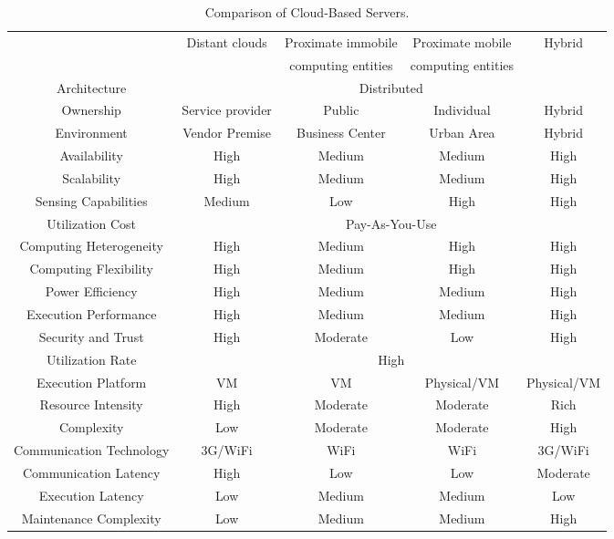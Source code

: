 \documentclass[publish]{IEEEtran}
\begin{document}
\begin{table*} [tbph]
\centering
\caption{Comparison of Cloud-Based Servers.} \label{cloud-basedservers}
\begin{tabular}{|c|c|c|c|c|}\hline
& Distant clouds& Proximate immobile & Proximate mobile & Hybrid \\  
& & computing entities & computing entities& \\ \hline
Architecture &\multicolumn{4}{c|}{Distributed}\\ \hline
Ownership& Service provider& Public & Individual& Hybrid\\  \hline
Environment& Vendor Premise & Business Center & Urban Area & Hybrid\\ \hline
Availability & High & Medium& Medium& High \\ \hline
Scalability& High & Medium & Medium& High\\ \hline
Sensing Capabilities& Medium & Low & High & High \\ \hline 
Utilization Cost& \multicolumn{4}{c|}{Pay-As-You-Use}\\ \hline
Computing Heterogeneity & High & Medium& High&High \\ \hline
Computing Flexibility& High&Medium&High& High\\ \hline
Power Efficiency & High&Medium&Medium& High\\ \hline
Execution Performance& High&Medium &  Medium & High\\ \hline
Security and Trust&\multicolumn{1}{c|}{High} & \multicolumn{1}{c|}{Moderate}&\multicolumn{1}{c|}{Low}&\multicolumn{1}{c|}{High}\\ \hline
Utilization Rate & \multicolumn{4}{c|}{High}\\ \hline
Execution Platform & VM & VM & Physical/VM& Physical/VM \\ \hline
Resource Intensity & High & Moderate& Moderate& Rich\\ \hline
Complexity & Low & Moderate& Moderate& High\\ \hline
Communication Technology&3G/WiFi& WiFi & WiFi & 3G/WiFi\\ \hline
Communication Latency & High & Low & Low& Moderate\\ \hline
Execution Latency & Low & Medium & Medium & Low \\ \hline
Maintenance Complexity & Low & Medium& Medium& High \\ \hline
\end{tabular}
\end{table*}
\end{document}

